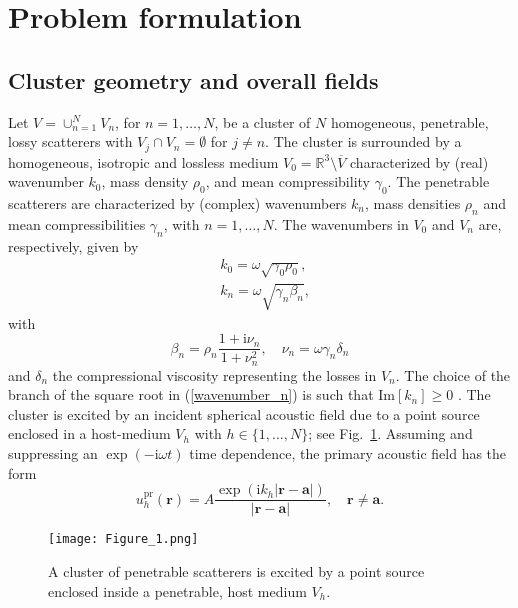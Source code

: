 \documentclass{article}
\begin{document}
\section{Problem formulation}
%
\subsection{Cluster geometry and overall fields}
%
Let $V=\cup_{n=1}^NV_n$, for $n=1,\ldots,N$, be a cluster of $N$ homogeneous, penetrable, lossy scatterers with $V_j\cap V_n=\emptyset$ for $j\ne n$. 
The cluster is surrounded by a homogeneous, isotropic and lossless medium $V_0=\mathbb{R}^3\setminus \overline{V}$ characterized by (real) wavenumber $k_0$, mass density $\rho_0$, and mean compressibility $\gamma_0$. 
The penetrable scatterers are characterized by (complex) wavenumbers $k_n$, mass densities $\rho_n$ and mean compressibilities $\gamma_n$, with $n=1,\ldots,N$.
The wavenumbers in $V_0$ and $V_n$ are, respectively, given by
%
\begin{align}
    \label{wavenumber_0}
    &k_0=\omega\sqrt{\gamma_0\rho_0}, \\
    &k_n=\omega\sqrt{\gamma_n\beta_n},
\label{wavenumber_n}
\end{align}
%
with 
$$\beta_n=\rho_n\frac{1+\mathrm{i}\nu_n}{1+\nu_n^2},\quad \nu_n=\omega\gamma_n\delta_n$$
and $\delta_n$ the compressional viscosity representing the losses in $V_n$. The choice of the branch of the square root in (\ref{wavenumber_n}) is such that $\mathrm{Im}[k_n]\geq0$ \cite{LFS}.
The cluster is excited by an incident spherical acoustic field due to a point source enclosed in a host-medium $V_h$ with $h\in\{1,\ldots,N\}$; see Fig.~\ref{fig:mult1}. Assuming and suppressing an $\exp(-\mathrm{i}\omega t)$ time dependence, the primary acoustic field has the form
%
\begin{equation}\label{eq:prim}
    u_h^{\mathrm{pr}}(\mathbf{r})=A\frac{\exp{\left(\mathrm{i}k_h\lvert \mathbf{r}-\mathbf{a}\rvert \right)}}{\lvert \mathbf{r}-\mathbf{a}\rvert }, \quad \mathbf{r}\ne\mathbf{a}.
\end{equation}
%
\begin{figure}[!htb]
\centering
\texttt{[image: Figure\_1.png]}
\caption{A cluster of penetrable scatterers is excited by a point source enclosed inside a penetrable, host medium $V_{h}$.}
\label{fig:mult1}
\end{figure}
%
\end{document}
